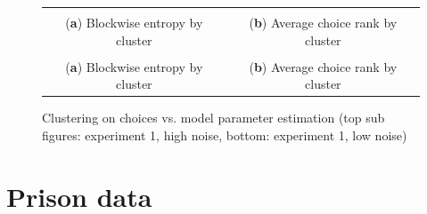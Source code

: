 \documentclass[12pt,a4paper,bibliography=totocnumbered,listof=totocnumbered]{scrartcl}
\begin{document}
{\begin{appendix}
\begin{figure}[H]
	\centering
	\small
	\hspace*{-0.7in}
	\begin{tabular}{cc}
			 &  \\
				(\textbf{a}) Blockwise entropy by cluster & (\textbf{b}) Average choice rank by cluster \\
			 &  \\
				(\textbf{a}) Blockwise entropy by cluster & (\textbf{b}) Average choice rank by cluster \\
		\end{tabular} \quad
		\caption{Clustering on choices vs. model parameter estimation (top sub figures: experiment 1, high noise, bottom: experiment 1, low noise)}
		\label{fig:cluse1c3}
\end{figure}


\pagebreak
\section{Prison data}


\end{appendix}}
\end{document}
